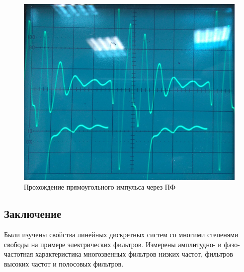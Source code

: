 \begin{figure}[H]
	\centering
	\includegraphics[scale=0.25]{images/2}
	\caption{Прохождение прямоугольного импульса через ПФ}
	\label{fig:ris2}
\end{figure}

\subsection{Заключение}
Были изучены свойства линейных дискретных систем со многими степенями свободы на примере электрических фильтров. Измерены амплитудно- и фазо-частотная характеристика многозвенных фильтров низких частот, фильтров высоких частот и полосовых фильтров.  

